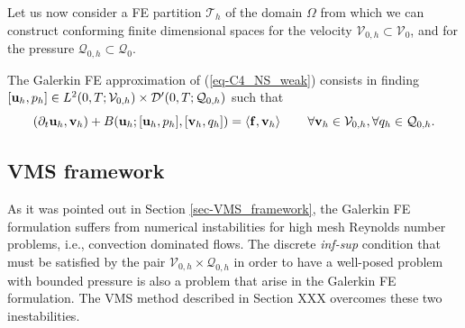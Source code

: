Let us now consider a FE partition $\mathcal{T}_h$ of the domain $\Omega$ from which we can construct conforming finite dimensional spaces for the velocity $\mathcal{V}_{0,h} \subset \mathcal{V}_0$, and for the pressure $\mathcal{Q}_{0,h}\subset \mathcal{Q}_0$. 

The Galerkin FE approximation of (\ref{eq-C4_NS_weak}) consists in finding $[{\bf u}_h,p_h]\in {L}^2(0,T;\mathcal{V}_{0,h})\times {\cal D}'(0,T;\mathcal{Q}_{0,h})$ such that
\begin{equation}
\label{eq-C4_NS_galerkin}
(\partial_t{\bf u}_h,{\bf v}_h) + B({\bf u}_h;[{\bf u}_h,p_h],[{\bf v}_h,q_h]) =\left<{\bf f},{\bf v}_h\right>
\quad\quad\forall{\bf v}_h\in\mathcal{V}_{0,h},\forall q_h\in\mathcal{Q}_{0,h}.
\end{equation}

\subsection{VMS framework}
\label{subsec-C4_VMS_framework}
As it was pointed out in Section \ref{sec-VMS_framework}, the Galerkin FE formulation  suffers from numerical instabilities for high mesh Reynolds number problems, i.e., convection dominated flows. The discrete \textit{inf-sup} condition that must be satisfied by the pair $\mathcal{V}_{0,h} \times\mathcal{Q}_{0,h}$ in order to have a well-posed problem with bounded pressure is also a problem that arise in the Galerkin FE formulation. The VMS method described in Section XXX overcomes these two inestabilities.

